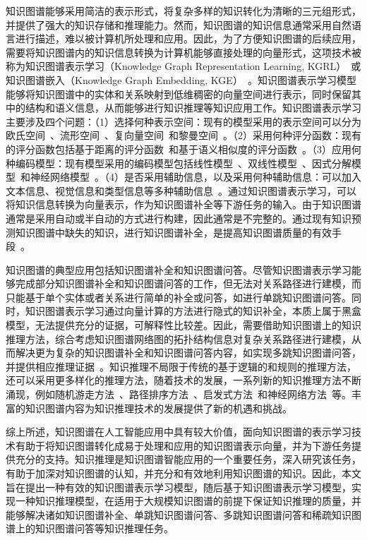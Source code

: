 \documentclass[algorithmlist, AutoFakeBold, AutoFakeSlant, figurelist, tablelist, nomlist, engineering]{seuthesix}
\begin{document}
知识图谱能够采用简洁的表示形式，将复杂多样的知识转化为清晰的三元组形式，并提供了强大的知识存储和推理能力。然而，知识图谱的知识信息通常采用自然语言进行描述，难以被计算机所处理和应用。因此，为了方便知识图谱的后续应用，需要将知识图谱内的知识信息转换为计算机能够直接处理的向量形式，这项技术被称为知识图谱表示学习（Knowledge Graph Representation Learning, KGRL）~\cite{chen2022rlpath}或知识图谱嵌入（Knowledge Graph Embedding, KGE）~\cite{wang2021transet}。知识图谱表示学习模型能够将知识图谱中的实体和关系映射到低维稠密的向量空间进行表示，同时保留其中的结构和语义信息，从而能够进行知识推理等知识应用工作。知识图谱表示学习主要涉及四个问题：（1）选择何种表示空间：现有的模型采用的表示空间可以分为欧氏空间~\cite{lu2022dense}、流形空间~\cite{ebisu2018toruse}、复向量空间~\cite{trouillon2016complex}和黎曼空间~\cite{pan2021hyperbolic}。（2）采用何种评分函数：现有的评分函数包括基于距离的评分函数~\cite{sachan2020knowledge}和基于语义相似度的评分函数~\cite{xiao2017ssp}。（3）应用何种编码模型：现有模型采用的编码模型包括线性模型~\cite{peng2020lineare}、双线性模型~\cite{pan2021hyperbolic}、因式分解模型~\cite{ji2015knowledge}和神经网络模型~\cite{jiang2021kernel}。（4）是否采用辅助信息，以及采用何种辅助信息：可以加入文本信息、视觉信息和类型信息等多种辅助信息~\cite{wang2017knowledge}。通过知识图谱表示学习，可以将知识信息转换为向量表示，作为知识图谱补全等下游任务的输入。由于知识图谱通常是采用自动或半自动的方式进行构建，因此通常是不完整的。通过现有知识预测知识图谱中缺失的知识，进行知识图谱补全，是提高知识图谱质量的有效手段~\cite{vu2019capsule}。

知识图谱的典型应用包括知识图谱补全和知识图谱问答。尽管知识图谱表示学习能够完成部分知识图谱补全和知识图谱问答的工作，但无法对关系路径进行建模，而只能基于单个实体或者关系进行简单的补全或问答，如进行单跳知识图谱问答。同时，知识图谱表示学习通过向量计算的方法进行隐式的知识补全，本质上属于黑盒模型，无法提供充分的证据，可解释性比较差。因此，需要借助知识图谱上的知识推理方法，综合考虑知识图谱网络图的拓扑结构信息对复杂关系路径进行建模，从而解决更为复杂的知识图谱补全和知识图谱问答内容，如实现多跳知识图谱问答，并提供相应推理证据~\cite{chen2020review}。知识推理不局限于传统的基于逻辑的和规则的推理方法，还可以采用更多样化的推理方法，随着技术的发展，一系列新的知识推理方法不断涌现，例如随机游走方法~\cite{jagvaral2020path}、路径排序方法~\cite{zhao2021target}、启发式方法~\cite{he2021heuristic}和神经网络方法~\cite{wang2018deep}等。丰富的知识图谱内容为知识推理技术的发展提供了新的机遇和挑战。

综上所述，知识图谱在人工智能应用中具有较大价值，面向知识图谱的表示学习技术有助于将知识图谱转化成易于处理和应用的知识图谱表示向量，并为下游任务提供充分的支持。知识推理是知识图谱智能应用的一个重要任务，深入研究该任务，有助于加深对知识图谱的认知，并充分和有效地利用知识图谱的知识。因此，本文旨在提出一种有效的知识图谱表示学习模型，随后基于知识图谱表示学习模型，实现一种知识推理模型，在适用于大规模知识图谱的前提下保证知识推理的质量，并能够解决诸如知识图谱补全、单跳知识图谱问答、多跳知识图谱问答和稀疏知识图谱上的知识图谱问答等知识推理任务。
\end{document}
